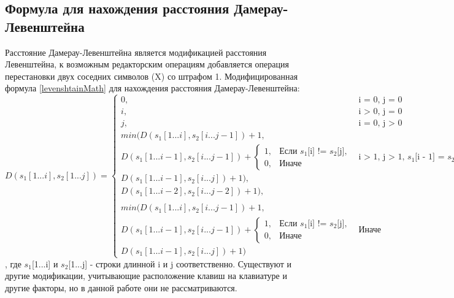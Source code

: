 \documentclass{article}
\begin{document}
		\subsection{Формула для нахождения расстояния Дамерау-Левенштейна}
		Расстояние Дамерау-Левенштейна является модификацией расстояния Левенштейна, к возможным редакторским операциям добавляется операция перестановки двух соседних символов (X) со штрафом 1.
		\newline
		\indent Модифицированная формула \ref{levenshtainMath} для нахождения расстояния Дамерау-Левенштейна:
			\begin{equation}\label{damerauLevenshtainMath}
			D(s_1[1...i], s_2[1...j]) = 
			\begin{cases}
			   0,  &\text{i = 0, j = 0}\\
			   i, &\text{i > 0, j = 0}\\
			   j, &\text{i = 0, j > 0}\\
			   min(D(s_1[1...i], s_2[i...j - 1]) + 1, \\
	     			    D(s_1[1...i - 1], s_2[i...j - 1]) + \begin{cases}
	     			                           1, &\text{Если $s_1$[i] != $s_2$[j]},\\0, &\text{Иначе}
	     			                           \end{cases} &\text{i > 1, j > 1, $s_1$[i - 1] = $s_2$[j], $s_1$[i] = $s_2$[j - 1]}\\
			         D(s_1[1...i - 1], s_2[i...j]) + 1),\\
			         D(s_1[1...i - 2], s_2[i...j - 2]) + 1),\\\\
			min(D(s_1[1...i], s_2[i...j - 1]) + 1, \\
	     			    D(s_1[1...i - 1], s_2[i...j - 1]) + \begin{cases}
	     			                           1, &\text{Если $s_1$[i] != $s_2$[j]},\\0, &\text{Иначе}
	     			                           \end{cases} &\text{Иначе}\\
			         D(s_1[1...i - 1], s_2[i...j]) + 1)
			         \end{cases}
			 \end{equation}, где $s_1$[1...i] и $s_2$[1...j] - строки длинной i и j соответственно.
		 \newline
		 \newline
		 \indent Существуют и другие модификации, учитывающие расположение клавиш на клавиатуре и другие факторы, но в данной работе они не рассматриваются.
	\newpage
\end{document}
